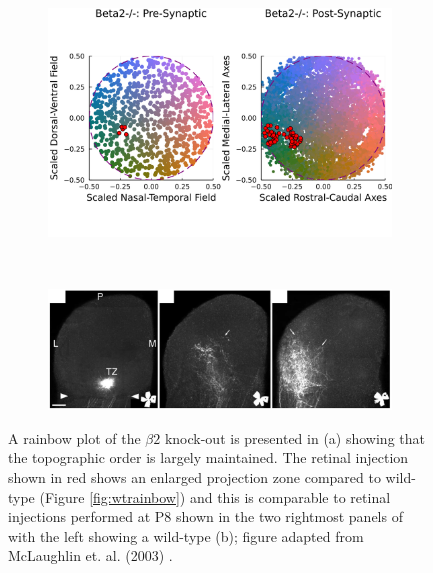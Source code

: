 \begin{figure}
	\begin{subfigure}{\textwidth}
		\centering
		\includegraphics[width=\textwidth]{images/distributed_kernels/figure_distributed_kernels_Beta2}
		\caption{}
	\end{subfigure}
	~
	\begin{subfigure}{\textwidth}
		\centering
		\includegraphics[width=\textwidth]{images/distributed_kernels/beta2}
		\caption{}
	\end{subfigure}
	\def\c{A rainbow plot of the $\beta2$ knock-out is presented.}
	\caption[\c]{\label{fig:beta2rainbow} A rainbow plot of the $\beta2$ knock-out is presented in (a) showing that the topographic order is largely maintained. The retinal injection shown in red shows an enlarged projection zone compared to wild-type (Figure \ref{fig:wtrainbow}) and this is comparable to retinal injections performed at P8 shown in the two rightmost panels of with the left showing a wild-type (b); figure adapted from McLaughlin et. al. (2003) \cite{McLaughlin2003-yy}.}
\end{figure}

